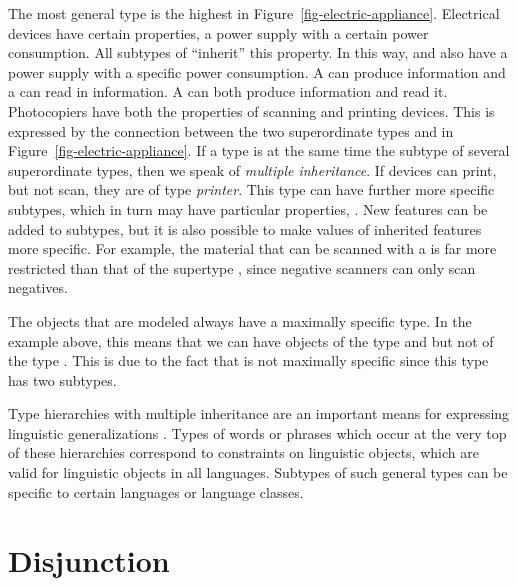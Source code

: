 The most general type  is the highest in Figure~\ref{fig-electric-appliance}. Electrical devices have certain properties, \eg 
a power supply with a certain power consumption. All subtypes of   ``inherit'' this property. In this way,  and
 also have a power supply with a specific power consumption. A
 can produce information and a  can read in information. A  can both produce information and read it. Photocopiers have both the properties of scanning and printing devices.
This is expressed by the connection between the two superordinate types and  in
Figure~\ref{fig-electric-appliance}. If a type is at the same time the subtype of several superordinate types, then we
speak of \emph{multiple inheritance}. If devices can print, but not scan, they are of type \emph{printer}. This type can have further more
specific subtypes, which in turn may have particular properties, \eg {}. New
features can be added to subtypes, but it is also possible to make values of inherited features more
specific. For example, the material that can be scanned with a  is far more
restricted than that of the supertype , since negative scanners can only scan negatives.

\addlines
The objects that are modeled always have a maximally specific type. In the example above, this means that we can have objects of the type  and 
but not of the type . This is due to the fact that  is not maximally specific since this type has two subtypes.

Type hierarchies with multiple inheritance are an important means for expressing linguistic generalizations \citep*{FPW85a,Flickinger87,Sag97a}. Types of words or phrases which
occur at the very top of these hierarchies correspond to constraints on linguistic objects, which are valid for linguistic objects in all languages. Subtypes of such general types
can be specific to certain languages or language classes.%

\section{Disjunction}

